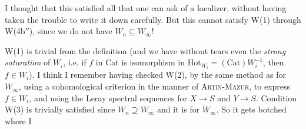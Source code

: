 \documentclass[11pt]{article}
\begin{document}
I thought that this satisfied all that one can ask of a localizer, without having taken the trouble to write it down carefully. But this cannot satisfy W(1) through W(4b$''$), since we %
do not have $W_n \subseteq W_\infty$!

W(1) is trivial from the definition (and we have without tears even the \textit{strong saturation} of $W_i$, %
i.e. if $f$ in Cat is isomorphism in $\mathrm{Hot}_{W_i} = (\mathrm{Cat})W_i^{-1}$, then $f \in W_i$). I think I remember having checked W(2), by the same method as for $W_\infty$, using a cohomological criterion in the manner of \textsc{Artin-Mazur}, to express $f \in W_i$, and using the Leray spectral sequences for $X \longrightarrow S$ and $Y \longrightarrow S$. Condition W(3) is trivially satisfied since $W_n \supseteq W_\infty$ and it is for $W_\infty$. So it gets botched where I
\end{document}
